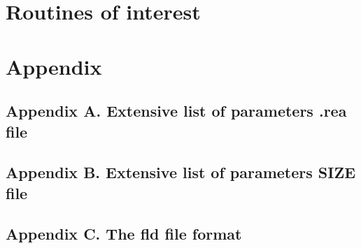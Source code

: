 \documentclass[11pt]{report}              %
\begin{document}
\chapter{Routines of interest}


%
\begin{comment}
\chapter{Postprocessing}
\section{Visualisation}

\end{comment} 
\chapter{Appendix}
\section{Appendix A. Extensive list of parameters .rea file}

\section{Appendix B. Extensive list of parameters SIZE file}

\section{Appendix C. The fld file format}

%


\renewcommand\refname{References}


\addtolength{\baselineskip}{-.1\baselineskip}

\addtolength{\baselineskip}{+.111111\baselineskip}
\end{document}
